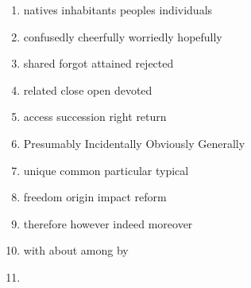 \begin{enumerate}
	\item
\fourchoices
{natives}
{inhabitants}
{peoples}
{individuals}




\item

\fourchoices
{confusedly}
{cheerfully}
{worriedly}
{hopefully}



\item


\fourchoices
{shared}
{forgot}
{attained}
{rejected}




\item


\fourchoices
{related}
{close}
{open}
{devoted}




\item


\fourchoices
{access}
{succession}
{right}
{return}




\item

\fourchoices
{Presumably}
{Incidentally}
{Obviously}
{Generally}


\item


\fourchoices
{unique}
{common}
{particular}
{typical}




\item


\fourchoices
{freedom}
{origin}
{impact}
{reform}




\item


\fourchoices
{therefore}
{however}
{indeed}
{moreover}




\item


\fourchoices
{with}
{about}
{among}
{by}




\item



\end{enumerate}
